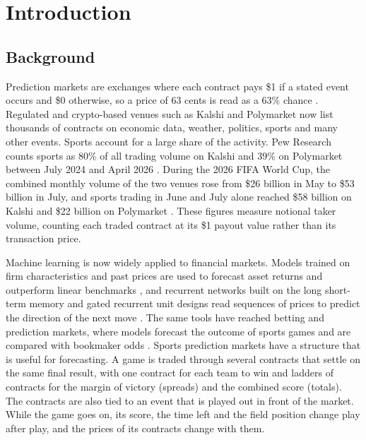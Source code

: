 \documentclass[12pt,a4paper,oneside]{report}
\begin{document}
\clearpage
{}
\setcounter{page}{1}

\chapter{Introduction}
\label{ch:intro}

\section{Background}
Prediction markets are exchanges where each contract pays \$1 if a stated event
occurs and \$0 otherwise, so a price of 63 cents is read as a 63\% chance
\citep{wolfers2004prediction,arrow2008promise}. Regulated and crypto-based venues
such as Kalshi and Polymarket now list thousands of contracts on economic data,
weather, politics, sports and many other events. Sports account for a large share
of the activity. Pew Research counts sports as 80\% of all trading volume on Kalshi
and 39\% on Polymarket between July 2024 and April 2026 \citep{radde2026trading}.
During the 2026 FIFA World Cup, the combined monthly volume of the two venues rose
from \$26 billion in May to \$53 billion in July, and sports trading in June and
July alone reached \$58 billion on Kalshi and \$22 billion on Polymarket
\citep{radde2026doubled}.
These figures measure notional taker volume, counting each traded contract at its
\$1 payout value rather than its transaction price.

Machine learning is now widely applied to financial markets. Models trained on
firm characteristics and past prices are used to forecast asset returns and
outperform linear benchmarks \citep{gu2020empirical}, and recurrent networks built
on the long short-term memory and gated recurrent unit designs read sequences of
prices to predict the direction of the next move
\citep{fischer2018deep,cho2014learning}. The same tools have reached betting and
prediction markets, where models forecast the outcome of sports games and are
compared with bookmaker odds \citep{bunker2019machine,galekwa2024systematic}.
Sports prediction markets have a structure that is useful for forecasting.
A game is traded through several
contracts that settle on the same final result, with one contract for each team to
win and ladders of contracts for the margin of victory (spreads) and the combined
score (totals). The contracts are also tied to an event that is played out in front
of the market. While the game goes on, its score, the time left and the field
position change play after play, and the prices of its contracts change with them.
\end{document}
